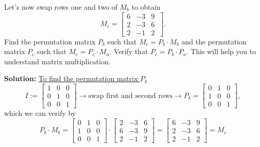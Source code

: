  \begin{example}
\label{ex:SolveUsingLu02} 
 Let's now swap rows one and two of $M_b$ to obtain
 $$M_c =  \left[ \begin{array}{rrr}  6 & -3& 9 \\  2 & -3 & 6\\ 2 & -1 & 2 \end{array}\ \right]. $$
Find the permutation matrix $P_b$ such that $M_c = P_b \cdot M_b$ and the permutation matrix $P_c$ such that $M_c = P_c \cdot M_a$. Verify that $P_c = P_b \cdot P_a$. This will help you to understand matrix multiplication.
\end{example}

\textbf{Solution:} \underline{To find the permutation matrix $P_b$} \\
 $$I:=\left[ \begin{array}{rrr} 1 & 0 & 0 \\ 0 & 1 & 0 \\ 0 & 0 & 1\end{array} \right] \rightarrow \text{swap first and second rows} \rightarrow P_b = \left[ \begin{array}{rrr} 0 & 1 & 0 \\ 1 & 0 & 0 \\ 0 & 0 & 1\end{array} \right],$$ 
 which we can verify by
 $$P_b \cdot M_b = \left[ \begin{array}{rrr}0 & 1 & 0 \\ 1 & 0 & 0 \\ 0 & 0 & 1\end{array} \right] \cdot \left[ \begin{array}{rrr}2 & -3 & 6 \\ 6 & -3 & 9 \\ 2 & -1 & 2\end{array} \right] = \left[ \begin{array}{rrr}6 & -3 & 9 \\ 2 & -3 & 6 \\ 2 & -1 & 2\end{array} \right] = M_c$$
 
